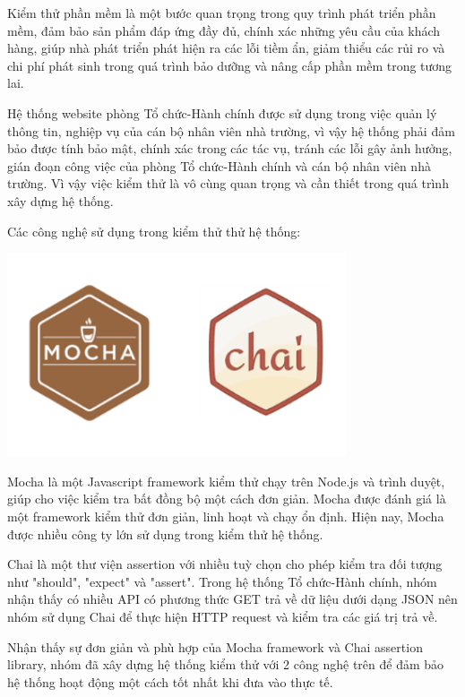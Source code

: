 Kiểm thử phần mềm là một bước quan trọng trong quy trình phát triển phần mềm, đảm bảo sản phẩm đáp ứng đầy đủ, chính xác những yêu cầu của khách hàng, giúp nhà phát triển phát hiện ra các lỗi tiềm ẩn, giảm thiểu các rủi ro và chi phí phát sinh trong quá trình bảo dưỡng và nâng cấp phần mềm trong tương lai.

Hệ thống website phòng Tổ chức-Hành chính được sử dụng trong việc quản lý thông tin, nghiệp vụ của cán bộ nhân viên nhà trường, vì vậy hệ thống phải đảm bảo được tính bảo mật, chính xác trong các tác vụ, tránh các lỗi gây ảnh hưởng, gián đoạn công việc của phòng Tổ chức-Hành chính và cán bộ nhân viên nhà trường. Vì vậy việc kiểm thử là vô cùng quan trọng và cần thiết trong quá trình xây dựng hệ thống.

Các công nghệ sử dụng trong kiểm thử thử hệ thống:
\begin{center}
  \captionsetup{type=figure}
  \includegraphics[width=10cm]{img/mocha_chai.png}
\end{center}

Mocha là một Javascript framework kiểm thử chạy trên Node.js và trình duyệt, giúp cho việc kiểm tra bất đồng bộ một cách đơn giản. Mocha được đánh giá là một framework kiểm thử đơn giản, linh hoạt và chạy ổn định. Hiện nay, Mocha được nhiều công ty lớn sử dụng trong kiểm thử hệ thống.

Chai là một thư viện assertion với nhiều tuỳ chọn cho phép kiểm tra đối tượng như "should", "expect" và "assert". Trong hệ thống Tổ chức-Hành chính, nhóm nhận thấy có nhiều API có phương thức GET trả về dữ liệu dưới dạng JSON nên nhóm sử dụng Chai để thực hiện HTTP request và kiểm tra các giá trị trả về.

Nhận thấy sự đơn giản và phù hợp của Mocha framework và Chai assertion library, nhóm đã xây dựng hệ thống kiểm thử với 2 công nghệ trên để đảm bảo hệ thống hoạt động một cách tốt nhất khi đưa vào thực tế.

